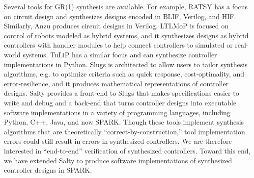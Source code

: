 \documentclass[runningheads]{llncs}
\begin{document}
Several tools for GR(1) synthesis are available. 
For example, RATSY %
\cite{bloem2010ratsy} has a focus on circuit design and synthesizes designs 
encoded in BLIF, %
Verilog, and HIF. %
Similarly, Anzu \cite{jobstmann2007anzu} produces circuit designs in Verilog.
LTLMoP 
\cite{finucane2010ltlmop} is focused on control of robots modeled as hybrid systems, 
and it synthesizes designs as hybrid controllers with handler modules to help connect controllers to simulated or real-world systems. 
TuLiP 
\cite{TuLiP2011} has a similar focus and can synthesize controller implementations in Python. 
Slugs 
\cite{Ehlers2016} is architected to allow users to tailor synthesis algorithms,
 e.g. to optimize criteria such as quick response, cost-optimality, and error-resilience, and it produces mathematical representations of controller designs.
Salty \cite{elliott2019salty} provides a front-end to Slugs that makes specifications easier to write and debug and 
a back-end that turns controller designs into executable software implementations in a variety of programming languages, 
including Python, C++, Java, and now SPARK. 
Though these tools implement synthesis algorithms that are theoretically ``correct-by-construction,''
tool implementation errors could still result in errors in synthesized controllers.
We are therefore interested in ``end-to-end'' verification of synthesized controllers.
Toward this end, we have extended Salty to produce software implementations of synthesized controller designs in SPARK.
\end{document}
